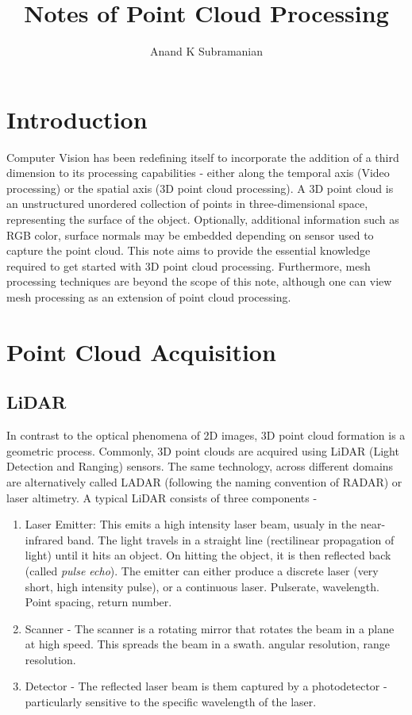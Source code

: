 


\title{Notes of Point Cloud Processing}
\author{Anand K Subramanian}
\date{}



\maketitle

\section{Introduction}

Computer Vision has been redefining itself to incorporate the addition of a third dimension to its processing capabilities - either along the temporal axis (Video processing) or the spatial axis (3D point cloud processing). A 3D point cloud is an unstructured unordered collection of points in three-dimensional space, representing the surface of the object. Optionally, additional information such as RGB color, surface normals may be embedded depending on sensor used to capture the point cloud. This note aims to provide the essential knowledge required to get started with 3D point cloud processing. Furthermore, mesh processing techniques are beyond the scope of this note, although one can view mesh processing as an extension of point cloud processing.


\section{Point Cloud Acquisition}
\subsection{LiDAR}
In contrast to the optical phenomena of 2D images, 3D point cloud formation is a geometric process. Commonly, 3D point clouds are acquired using LiDAR (Light Detection and Ranging) sensors. The same technology, across different domains are alternatively called LADAR (following the naming convention of RADAR) or laser altimetry. A typical LiDAR consists of three components -
\begin{enumerate}
    \item Laser Emitter: This emits a high intensity laser beam, usualy in the near-infrared band. The light travels in a straight line (rectilinear propagation of light) until it hits an object. On hitting the object, it is then reflected back (called \textit{pulse echo}). The emitter can either produce a discrete laser (very short, high intensity pulse), or a continuous laser.  Pulserate, wavelength. Point spacing, return number.
    \item Scanner - The scanner is a rotating mirror that rotates the beam in a plane at high speed. This spreads the beam in a swath. angular resolution, range resolution.
    \item Detector - The reflected laser beam is them captured by a photodetector - particularly sensitive to the specific wavelength of the laser.
\end{enumerate}

